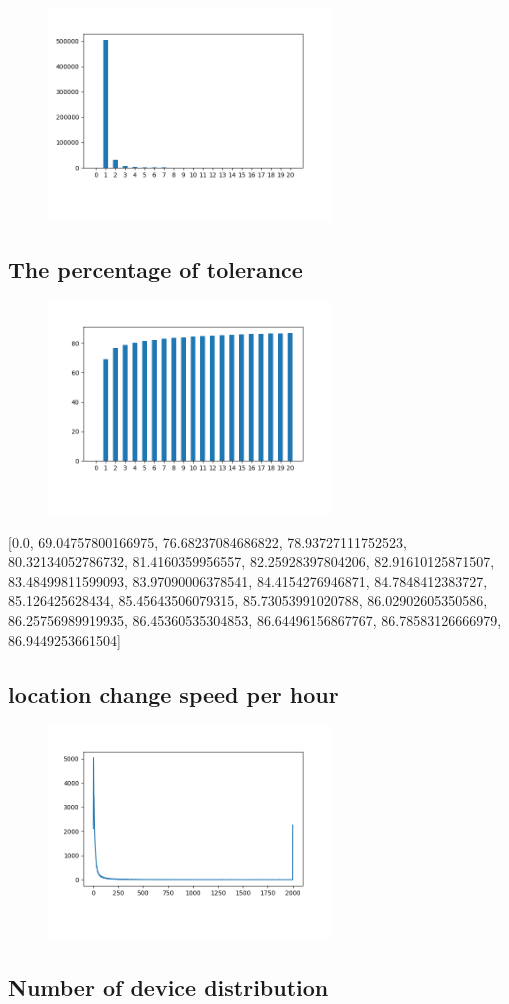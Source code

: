 \documentclass[10pt, conference, compsocconf]{IEEEtran}
\begin{document}
\begin{figure}[H]\centering\includegraphics[width=75mm,scale=0.5]{BasedonClientIDnumberofusersfingerprint}\end{figure}\subsection{The percentage of tolerance}
\begin{figure}[H]\centering\includegraphics[width=75mm,scale=0.5]{BasedonClientIDtolerance}\end{figure}[0.0, 69.04757800166975, 76.68237084686822, 78.93727111752523, 80.32134052786732, 81.4160359956557, 82.25928397804206, 82.91610125871507, 83.48499811599093, 83.97090006378541, 84.4154276946871, 84.7848412383727, 85.126425628434, 85.45643506079315, 85.73053991020788, 86.02902605350586, 86.25756989919935, 86.45360535304853, 86.64496156867767, 86.78583126666979, 86.9449253661504]\subsection{location change speed per hour}
\begin{figure}[H]\centering\includegraphics[width=75mm,scale=0.5]{BasedonClientIDlocationchange}\end{figure}\subsection{Number of device distribution}
\end{document}
